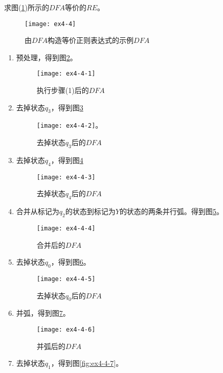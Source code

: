 \begin{example}
	求图(\ref{fig:ex4-4})所示的$DFA$等价的$RE$。
	\begin{figure}[htbp]
		\texttt{[image: ex4-4]}
		\caption{由$DFA$构造等价正则表达式的示例$DFA$}
		\label{fig:ex4-4}       %
	\end{figure}
    
    \begin{enumerate}
    	\item 预处理，得到图\ref{fig:ex4-4-1}。
	    \begin{figure}[htbp]
	    	\texttt{[image: ex4-4-1]}
	    	\caption{执行步骤(1)后的$DFA$}
	    	\label{fig:ex4-4-1}       %
	    \end{figure}
		\item 去掉状态$q_3$，得到图\ref{fig:ex4-4-2}
		\begin{figure}[htbp]
			\texttt{[image: ex4-4-2]}。
			\caption{去掉状态$q_3$后的$DFA$}
			\label{fig:ex4-4-2}       %
		\end{figure}
	    \item 去掉状态$q_4$，得到图\ref{fig:ex4-4-3}
		\begin{figure}[htbp]
			\texttt{[image: ex4-4-3]}
			\caption{去掉状态$q_4$后的$DFA$}
			\label{fig:ex4-4-3}       %
		\end{figure}
	    \item 合并从标记为$q_2$的状态到标记为$Y$的状态的两条并行弧。得到图\ref{fig:ex4-4-4}。 
	    \begin{figure}[htbp]
	    	\texttt{[image: ex4-4-4]}
	    	\caption{合并后的$DFA$}
	    	\label{fig:ex4-4-4}       %
	    \end{figure}
        \item 去掉状态$q_0$，得到图\ref{fig:ex4-4-5}。
        \begin{figure}[htbp]
        	\texttt{[image: ex4-4-5]}
        	\caption{去掉状态$q_0$后的$DFA$}
        	\label{fig:ex4-4-5}       %
        \end{figure}
        \item 并弧，得到图\ref{fig:ex4-4-6}。
        \begin{figure}[htbp]
        	\texttt{[image: ex4-4-6]}
        	\caption{并弧后的$DFA$}
        	\label{fig:ex4-4-6}       %
        \end{figure}
        \item 去掉状态$q_1$，得到图\ref{fig:ex4-4-7}。

\end{enumerate}
\end{example}
